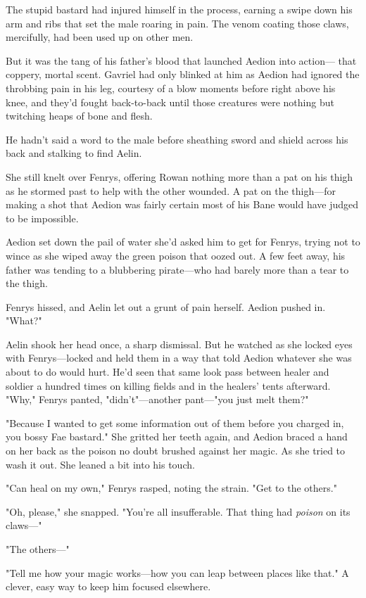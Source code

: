 The stupid bastard had injured himself in the process, earning a swipe down his arm and ribs that set the male roaring in pain. The venom coating those claws, mercifully, had been used up on other men.

But it was the tang of his father's blood that launched Aedion into action--- that coppery, mortal scent. Gavriel had only blinked at him as Aedion had ignored the throbbing pain in his leg, courtesy of a blow moments before right above his knee, and they'd fought back-to-back until those creatures were nothing but twitching heaps of bone and flesh.

He hadn't said a word to the male before sheathing sword and shield across his back and stalking to find Aelin.

She still knelt over Fenrys, offering Rowan nothing more than a pat on his thigh as he stormed past to help with the other wounded. A pat on the thigh---for making a shot that Aedion was fairly certain most of his Bane would have judged to be impossible.

Aedion set down the pail of water she'd asked him to get for Fenrys, trying not to wince as she wiped away the green poison that oozed out. A few feet away, his father was tending to a blubbering pirate---who had barely more than a tear to the thigh.

Fenrys hissed, and Aelin let out a grunt of pain herself. Aedion pushed in. "What?"

Aelin shook her head once, a sharp dismissal. But he watched as she locked eyes with Fenrys---locked and held them in a way that told Aedion whatever she was about to do would hurt. He'd seen that same look pass between healer and soldier a hundred times on killing fields and in the healers' tents afterward. "Why," Fenrys panted, "didn't"---another pant---"you just melt them?"

"Because I wanted to get some information out of them before you charged in, you bossy Fae bastard." She gritted her teeth again, and Aedion braced a hand on her back as the poison no doubt brushed against her magic. As she tried to wash it out. She leaned a bit into his touch.

"Can heal on my own," Fenrys rasped, noting the strain. "Get to the others."

"Oh, please," she snapped. "You're all insufferable. That thing had
\emph{poison} on its claws---"

"The others---"

"Tell me how your magic works---how you can leap between places like that." A clever, easy way to keep him focused elsewhere.

